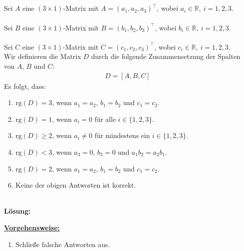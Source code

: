 \newpage

\subsection*{}
Sei $ A $ eine $ (3 \times 1) $-Matrix mit $A = (a_1, a_2, a_3)^\top$, wobei $ a_i \in \mathbb{R}, \ i = 1,2,3$.\\
\\
Sei $ B $ eine $ (3 \times 1) $-Matrix mit $B = (b_1, b_2, b_3)^\top$, wobei $ b_i \in \mathbb{R}, \ i = 1,2,3$.\\
\\
Sei $ C $ eine $ (3 \times 1) $-Matrix mit $C = (c_1, c_2, c_3)^\top$, wobei $ c_i \in \mathbb{R}, \ i = 1,2,3$.\\

Wir definieren die Matrix $D$ durch die folgende Zusammensetzung der Spalten von $A$, $B$ und $C$:
\begin{align*}
	D = [A,B,C]
\end{align*}
Es folgt, dass:
\renewcommand{\labelenumi}{(\alph{enumi})}
\begin{enumerate}
	\item 
	$ \mathrm{rg}(D) = 3 $, wenn $a_1 = a_2$, $b_1 = b_2$ und $c_1 = c_2$.
	\item
	$ \mathrm{rg}(D) = 1 $, wenn $ a_i = 0 $ für alle $ i \in \{1,2,3\} $.
	\item
	$ \mathrm{rg}(D) \geq  2 $, wenn $ a_i \neq 0 $ für mindestens ein $ i \in \{1,2,3\} $.
	\item
	$ \mathrm{rg}(D) < 3 $, wenn $a_3 = 0$, $b_3 = 0$ und $a_1 b_2 = a_2 b_1$. 
	\item
	$ \mathrm{rg}(D) = 2 $, wenn $a_1 = a_2$, $b_1 = b_2$ und $c_1 = c_2$.
	\item 
	Keine der obigen Antworten ist korrekt.
\end{enumerate}
\ \\
\textbf{Lösung:}
\begin{mdframed}
\underline{\textbf{Vorgehensweise:}}
\renewcommand{\labelenumi}{\theenumi.}
\begin{enumerate}
\item Schließe falsche Antworten aus.
\end{enumerate}
\end{mdframed}

